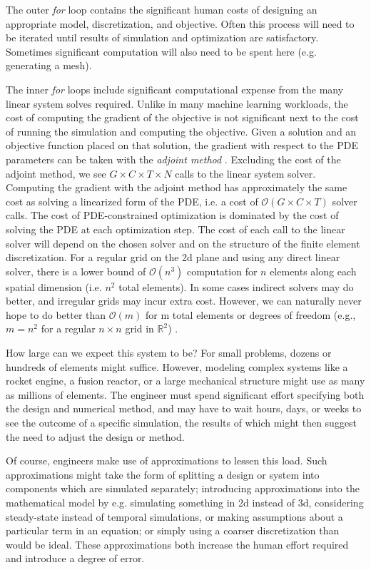 \documentclass{puthesis}
\begin{document}
The outer \emph{for} loop contains the significant human costs of designing an
appropriate model, discretization, and objective.
Often this process will need to be iterated until results of simulation and optimization
are satisfactory.
Sometimes significant computation will also need to be spent here (e.g. generating a mesh).

The inner \emph{for} loops include significant computational expense from the
many linear system solves required. Unlike in many machine learning workloads,
the cost of computing the gradient of the
objective is not significant next to the cost of running the simulation and computing
the objective. Given a solution and an objective function placed on that solution,
the gradient with respect to the PDE parameters can be taken with the \emph{adjoint method}
\citep{lions1971optimal,mitusch2019dolfin}. Excluding the cost of the adjoint method,
we see
$G \times C \times T \times N$ calls to the linear system solver. Computing the gradient
with the adjoint method has approximately the same cost as solving a linearized form of
the PDE, i.e. a cost of $\mathcal{O}(G \times C \times T)$ solver calls.
The cost of PDE-constrained optimization is dominated by the cost of solving the PDE
at each optimization step.
The cost of each call to the linear solver will depend on the chosen solver and on the
structure of the finite element discretization. For a regular grid on the 2d plane and
using any direct linear solver, there is a lower bound of $\mathcal{O}(n^3)$ computation
for $n$ elements along each spatial dimension (i.e. $n^2$ total elements).
In some cases indirect solvers may do better, and irregular grids may incur extra cost.
However, we can naturally never hope to do better than $\mathcal{O}(m)$ for m total
elements or degrees of freedom (e.g., $m = n^2$ for a regular $n \times n$ grid in $\mathbb{R}^2$)
\citep{hoffman1973complexity}.

How large can we expect this system to be? For small problems, dozens or hundreds of
elements might suffice.
However, modeling complex systems like a rocket engine, a fusion reactor, or a large mechanical structure might use as many as millions of elements.
The engineer must spend significant effort specifying both the design and numerical method,
and may have to wait hours, days, or weeks to see the outcome of a specific simulation,
the results of which might then suggest the need to adjust the design or method.

Of course, engineers make use of approximations to lessen this load.
Such approximations might take the form of splitting a design or system into components
which are simulated separately; introducing approximations into the mathematical
model by e.g. simulating something in 2d instead of 3d, considering steady-state
instead of temporal simulations, or making assumptions about a particular
term in an equation; or simply using a coarser discretization than would be ideal.
These approximations both increase the human effort required and introduce a degree of error.
\end{document}
